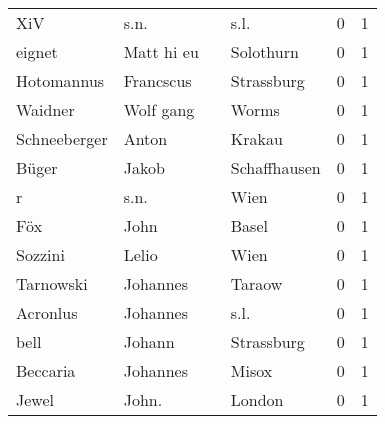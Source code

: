 \begin{center}
\begin{tiny}
\begin{longtabu}{llllrr}
                      XiV &                               s.n. &             &                                        s.l. &          0 &         1 \\
                   eignet &                         Matt hi eu &             &                                   Solothurn &          0 &         1 \\
               Hotomannus &                          Francscus &             &                                  Strassburg &          0 &         1 \\
                  Waidner &                          Wolf gang &             &                                       Worms &          0 &         1 \\
             Schneeberger &                              Anton &             &                                      Krakau &          0 &         1 \\
                    Büger &                              Jakob &             &                                Schaffhausen &          0 &         1 \\
                        r &                               s.n. &             &                                        Wien &          0 &         1 \\
                      Föx &                               John &             &                                       Basel &          0 &         1 \\
                  Sozzini &                              Lelio &             &                                        Wien &          0 &         1 \\
                Tarnowski &                           Johannes &             &                                      Taraow &          0 &         1 \\
                 Acronlus &                           Johannes &             &                                        s.l. &          0 &         1 \\
                     bell &                             Johann &             &                                  Strassburg &          0 &         1 \\
                 Beccaria &                           Johannes &             &                                       Misox &          0 &         1 \\
                    Jewel &                              John. &             &                                      London &          0 &         1 \\

\end{longtabu}
\end{tiny}
\end{center}
